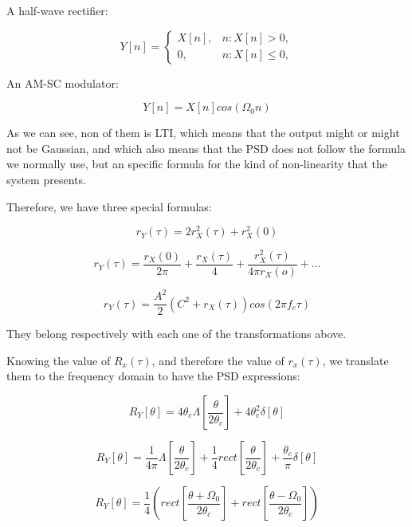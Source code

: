 \documentclass[a4paper,11pt]{article}
\begin{document}
A half-wave rectifier:

\begin{equation}
  Y[n] =
    \begin{cases}
        X[n],& n: X[n]>0,\\
        0,    & n: X[n] \leq 0,
    \end{cases}
\end{equation}

An AM-SC modulator:

\begin{equation}
  Y[n] =X[n]cos(\Omega_{0} n)
\end{equation}

As we can see, non of them is LTI, which means that the output might or might not be Gaussian, and which also means that the PSD does not follow the formula we normally use, but an specific formula for the kind of non-linearity that the system presents. 

Therefore, we have three special formulas:

\begin{equation}
  r_Y(\tau) = 2r_X^2(\tau) + r_X^2(0)
\end{equation}

\begin{equation}
  r_Y(\tau) = \frac{r_X(0)}{2\pi} + \frac{r_X(\tau)}{4} + \frac{r_X^2(\tau)}{4\pi r_X(o)} + ...
\end{equation}

\begin{equation}
  r_Y(\tau) = \frac{A^2}{2}(C^2 + r_X(\tau))cos(2\pi f_c \tau)
\end{equation}

They belong respectively with each one of the transformations above.

Knowing the value of $R_x(\tau)$, and therefore the value of $r_x(\tau)$, we translate them to the frequency domain to have the PSD expressions:

\begin{equation}
  R_Y[\theta] = 4\theta_c\Lambda[\frac{\theta}{2\theta_c}]+4\theta_c^2\delta[\theta]
\end{equation}

\begin{equation}
 R_Y[\theta] = \frac{1}{4\pi}\Lambda[\frac{\theta}{2\theta_c}]+\frac{1}{4}rect[\frac{\theta} {2\theta_c}]
+\frac{\theta_c}{\pi}\delta[\theta]
\end{equation}

\begin{equation}
  R_Y[\theta] = \frac{1}{4}(rect[\frac{\theta+\Omega_{0}} {2\theta_c}]+rect[\frac{\theta-\Omega_{0}} {2\theta_c}])
\end{equation}
\end{document}
